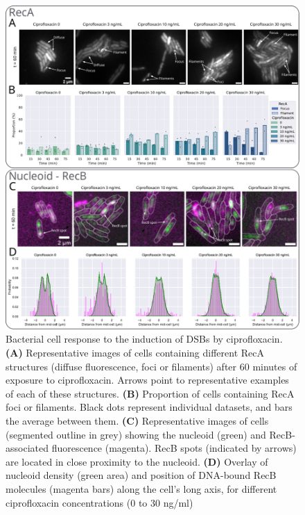 \begin{figure}[htbp]
    \centering
    \includegraphics[width=.8\textwidth]{Figures/Fig3_cell_response.pdf}
    \caption{Bacterial cell response to the induction of DSBs by ciprofloxacin. \textbf{(A)} Representative images of cells containing different RecA structures (diffuse fluorescence, foci or filaments) after 60 minutes of exposure to ciprofloxacin. Arrows point to representative examples of each of these structures. \textbf{(B)} Proportion of cells containing RecA foci or filaments. Black dots represent individual datasets, and bars the average between them. \textbf{(C)} Representative images of cells (segmented outline in grey) showing the nucleoid (green) and RecB-associated fluorescence (magenta). RecB spots (indicated by arrows) are located in close proximity to the nucleoid. \textbf{(D)} Overlay of nucleoid density (green area) and position of DNA-bound RecB molecules (magenta bars) along the cell's long axis, for different ciprofloxacin concentrations (0 to 30 ng/ml)}
    \label{Fig:reca_nucleoid}
\end{figure}


